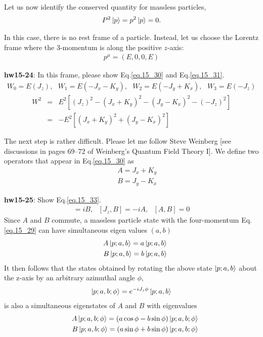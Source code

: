 \documentclass[12pt]{article}
\begin{document}
{{  Let us now identify the conserved quantity for massless particles,
\begin{eqnarray}
  P^2 \ket{p} = p^2 \ket{p} = 0. \label{eq.15_28}
\end{eqnarray}

  In this case, there is no rest frame of a particle. Instead, let us
  choose the Lorentz frame where the 3-momentum is along the positive
  $z$-axis:
\begin{eqnarray}
  p^\mu = ( E, 0, 0, E ) \label{eq.15_29}
\end{eqnarray}

{\bf hw15-24}: In this frame, please show Eq.\ref{eq.15_30} and  Eq.\ref{eq.15_31}.
\begin{eqnarray}
  W_0 =  E (   J_z       ),~~~W_1 =  E ( - J_x - K_y ),~~~W_2 =  E ( - J_y + K_x ),~~~W_3 =  E ( - J_z  ) \label{eq.15_30}
\end{eqnarray}
 \begin{eqnarray}
  W^2 &=&  E^2 [ (J_z)^2 - (J_x+K_y)^2 - (J_y-K_x)^2 -(-J_z)^2 ] \nonumber \\
  &=& -E^2 [ (J_x+K_y)^2 + (J_y-K_x)^2 ]\label{eq.15_31}
 \end{eqnarray}
  
  The next step is rather difficult.  Please let me follow Steve Weinberg
  [see discussions in pages 69--72 of Weinberg's Quantum Field Theory I]. We define two operators that appear in Eq.\ref{eq.15_30} as
\begin{eqnarray}
  &&A = J_x + K_y \label{eq.15_32a}\\
  &&B = J_y - K_x \label{eq.15_32b}
\end{eqnarray}

{\bf hw15-25}: Show Eq.\ref{eq.15_33}.
\begin{eqnarray}
  [ J_z, A ] =  i B,~~~[ J_z, B ] = -i A,~~~[   A, B ] = 0 \label{eq.15_33}
\end{eqnarray}
  Since $A$ and $B$ commute, a massless particle state with the four-momentum
  Eq.\ref{eq.15_29} can have simultaneous eigen values $(a,b)$
\begin{eqnarray}
  && A \ket{p;a,b} = a \ket{p;a,b} \label{eq.15_34a} \\
  && B \ket{p;a,b} = b \ket{p;a,b} \label{eq.15_34b}
\end{eqnarray}
  It then follows that the states obtained by rotating the above state
  $\ket{p;a,b}$ about the z-axis by an arbitrary azimuthal angle $\phi$,
\begin{eqnarray}
  \ket{p;a,b;\phi} = e^{ -iJ_z \phi } \ket{p;a,b} \label{eq.15_35}
\end{eqnarray}
  is also a simultaneous eigenstates of $A$ and $B$ with eigenvalues
\begin{eqnarray}
  && A \ket{p;a,b;\phi} = (a \cos\phi - b \sin\phi) \ket{p;a,b;\phi} \label{eq.15_36a}\\
  && B \ket{p;a,b;\phi} = (a \sin\phi + b \sin\phi) \ket{p;a,b;\phi} \label{eq.15_36b}
\end{eqnarray}
 
}}
\end{document}
